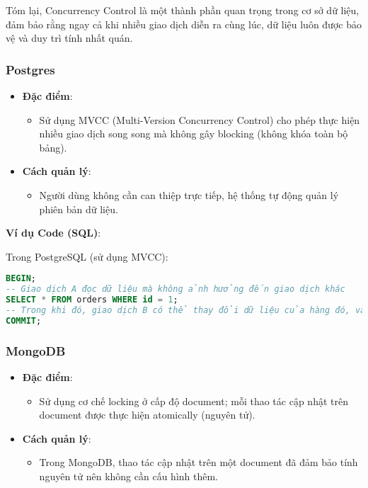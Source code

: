 Tóm lại, Concurrency Control là một thành phần quan trọng trong cơ sở dữ liệu, đảm bảo rằng ngay cả khi nhiều giao dịch diễn ra cùng lúc, dữ liệu luôn được bảo vệ và duy trì tính nhất quán.

\subsubsection{Postgres}

\begin{itemize}
    \item \textbf{Đặc điểm}:
    \begin{itemize}
        \item Sử dụng MVCC (Multi-Version Concurrency Control) cho phép thực hiện nhiều giao dịch song song mà không gây blocking (không khóa toàn bộ bảng).
    \end{itemize}
    \item \textbf{Cách quản lý}:
    \begin{itemize}
        \item Người dùng không cần can thiệp trực tiếp, hệ thống tự động quản lý phiên bản dữ liệu.
    \end{itemize}
\end{itemize}

\newpage

\textbf{Ví dụ Code (SQL)}:

Trong PostgreSQL (sử dụng MVCC):

\begin{lstlisting}[language=sql]
BEGIN;
-- Giao dịch A đọc dữ liệu mà không ảnh hưởng đến giao dịch khác
SELECT * FROM orders WHERE id = 1;
-- Trong khi đó, giao dịch B có thể thay đổi dữ liệu của hàng đó, và PostgreSQL sẽ tạo ra một phiên bản riêng cho mỗi giao dịch.
COMMIT;
\end{lstlisting}

\subsubsection{MongoDB}

\begin{itemize}
    \item \textbf{Đặc điểm}:
    \begin{itemize}
        \item Sử dụng cơ chế locking ở cấp độ document; mỗi thao tác cập nhật trên document được thực hiện atomically (nguyên tử).
    \end{itemize}
    \item \textbf{Cách quản lý}:
    \begin{itemize}
        \item Trong MongoDB, thao tác cập nhật trên một document đã đảm bảo tính nguyên tử nên không cần cấu hình thêm.
    \end{itemize}
\end{itemize}

